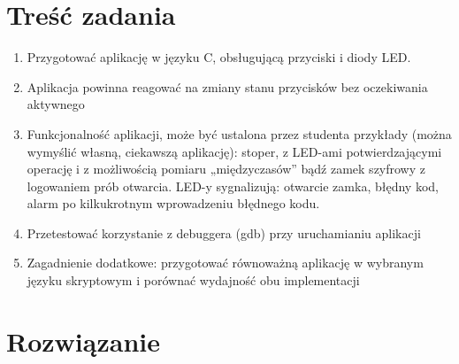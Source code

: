 
\usepackage{listings}

\maketitle
\tableofcontents
\newpage

\section{Treść zadania}
\begin{enumerate}
\item Przygotować aplikację w języku C, obsługującą przyciski i diody LED.
\item Aplikacja powinna reagować na zmiany stanu przycisków bez oczekiwania aktywnego
\item Funkcjonalność aplikacji, może być ustalona przez studenta przykłady 
(można wymyślić własną, ciekawszą aplikację): stoper, z LED-ami potwierdzającymi operację i
z możliwością pomiaru „międzyczasów” bądź zamek szyfrowy z logowaniem prób otwarcia. LED-y sygnalizują:
otwarcie zamka, błędny kod, alarm po kilkukrotnym wprowadzeniu błędnego kodu.
\item Przetestować korzystanie z debuggera (gdb) przy uruchamianiu aplikacji
\item Zagadnienie dodatkowe: przygotować równoważną aplikację w wybranym języku skryptowym i porównać
wydajność obu implementacji
\end{enumerate}

\section{Rozwiązanie}

